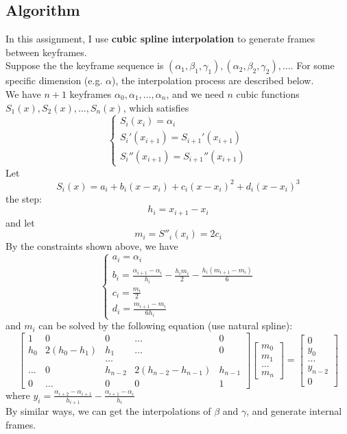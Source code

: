 \documentclass[acmtog]{acmart}
\begin{document}
\newpage
\vspace*{2 ex}
\subsection{Algorithm}
In this assignment, I use \textbf{cubic spline interpolation} to generate frames 
between keyframes.\\
Suppose the the keyframe sequence is $(\alpha_1, \beta_1, \gamma_1), (\alpha_2, \beta_2, \gamma_2), \ldots$. 
For some specific dimension (e.g. $\alpha$), the interpolation process are described below.\\
We have $n+1$ keyframes $\alpha_0, \alpha_1, \ldots, \alpha_{n}$, and we need $n$ cubic functions $S_1(x), S_2(x), \ldots, S_n(x)$, 
which satisfies
$$
\begin{cases}
	S_i(x_i) = \alpha_i\\
	S_i'(x_{i+1}) = S_{i+1}'(x_{i+1})\\
	S_i''(x_{i+1}) = S_{i+1}''(x_{i+1})
\end{cases}
$$
Let
$$S_i(x) = a_i + b_i(x-x_i) + c_i(x-x_i)^2 + d_i(x-x_i)^3$$
the step:
$$h_i = x_{i+1} - x_i$$
and let
$$m_i = S''_{i}(x_i) = 2c_i$$
By the constraints shown above, we have
$$
\begin{cases}
	a_i = \alpha_i\\
	b_i = \frac{\alpha_{i+1} - \alpha_i}{h_i} - \frac{h_im_i}{2} - \frac{h_i(m_{i+1} - m_{i})}{6}\\
	c_i = \frac{m_i}{2}\\
	d_i = \frac{m_{i+1} - m_{i}}{6h_i}
\end{cases}
$$
and $m_i$ can be solved by the following equation (use natural spline):
$$
\begin{bmatrix}
	1 & 0 & 0 & \ldots & 0\\
	h_0 & 2(h_0 - h_1) & h_1 & \ldots & 0\\
	& &\ldots & &\\
	\ldots & 0 & h_{n-2} & 2(h_{n-2} - h_{n-1}) & h_{n-1}\\
	0 & \ldots & 0 & 0 & 1
\end{bmatrix}
\begin{bmatrix}
	m_0\\
	m_1\\
	\ldots\\
	m_n
\end{bmatrix} = 
\begin{bmatrix}
	0\\
	y_0\\
	\ldots\\
	y_{n-2}\\
	0
\end{bmatrix}
$$
where $y_i = \frac{\alpha_{i+2} - \alpha_{i+1}}{h_{i+1}} - \frac{\alpha_{i+1} - \alpha_{i}}{h_{i}}$\\
By similar ways, we can get the interpolations of $\beta$ and $\gamma$, and generate internal frames.
\end{document}
